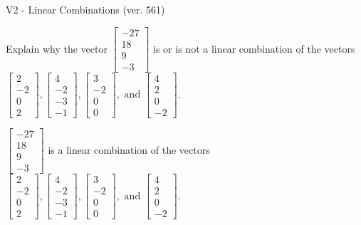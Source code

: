 \begin{exercise}
  \begin{exerciseTitle}V2 - Linear Combinations (ver. 561)\end{exerciseTitle}
  \begin{exerciseStatement}
    Explain why the vector \(\left[\begin{array}{c}
-27 \\
18 \\
9 \\
-3
\end{array}\right]\)  is or is not a linear 
	combination of the vectors \(\left[\begin{array}{c}
2 \\
-2 \\
0 \\
2
\end{array}\right] , \left[\begin{array}{c}
4 \\
-2 \\
-3 \\
-1
\end{array}\right] , \left[\begin{array}{c}
3 \\
-2 \\
0 \\
0
\end{array}\right] , \text{ and } \left[\begin{array}{c}
4 \\
2 \\
0 \\
-2
\end{array}\right]\).
	


  \end{exerciseStatement}
  \begin{exerciseAnswer}
   \(\left[\begin{array}{c}
-27 \\
18 \\
9 \\
-3
\end{array}\right]\) 
  	 is  
	a linear combination of the vectors \(\left[\begin{array}{c}
2 \\
-2 \\
0 \\
2
\end{array}\right] , \left[\begin{array}{c}
4 \\
-2 \\
-3 \\
-1
\end{array}\right] , \left[\begin{array}{c}
3 \\
-2 \\
0 \\
0
\end{array}\right] , \text{ and } \left[\begin{array}{c}
4 \\
2 \\
0 \\
-2
\end{array}\right]\).


\end{exerciseAnswer}
\end{exercise}
